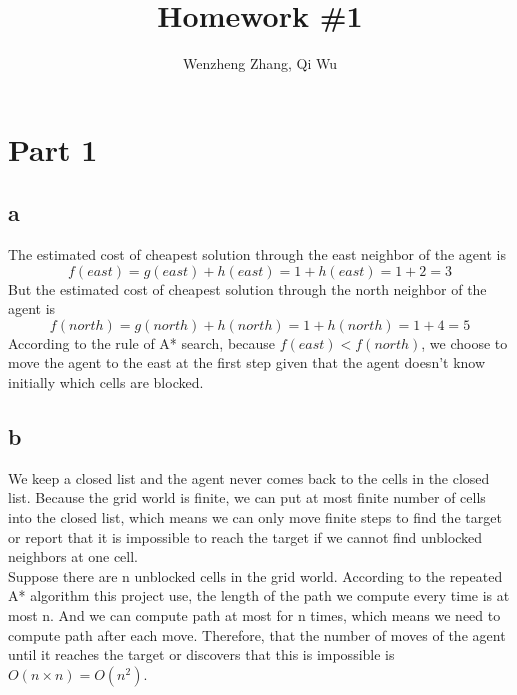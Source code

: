 \documentclass[11pt]{article}
\title{Homework \#1} %
\author{Wenzheng Zhang, Qi Wu} %
\begin{document}
\maketitle %


\section*{Part 1}





\subsection*{a}
 The estimated cost of cheapest solution through the east neighbor of the agent is
 $$f(east)=g(east)+h(east)=1+h(east)=1+2=3$$ 
 But the estimated cost of cheapest solution through the north neighbor of the agent is $$f(north)=g(north)+h(north)=1+h(north)=1+4=5$$ 
 According to the rule of A* search, because $f(east)<f(north)$, we choose to move the agent to  the east at the first step given that the agent doesn't know initially which cells are blocked.


\subsection*{b}
 We keep a closed list and the agent never comes back to the cells in the closed list. Because the grid world is finite, we can put at most finite number of cells  into the closed  list, which means we can only move finite steps to find the target or report that it is impossible to reach the target if we cannot find unblocked neighbors at one cell.\\
 Suppose there are n unblocked  cells in the grid world. According to the repeated A* algorithm this project use, the length of the path we compute every time is at most n. And we can compute path at most for n times, which means we  need to compute path after each move. Therefore, that the number of moves of the agent until it reaches the target or discovers that this is impossible is $O(n\times n)=O(n^2)$.
\end{document}
